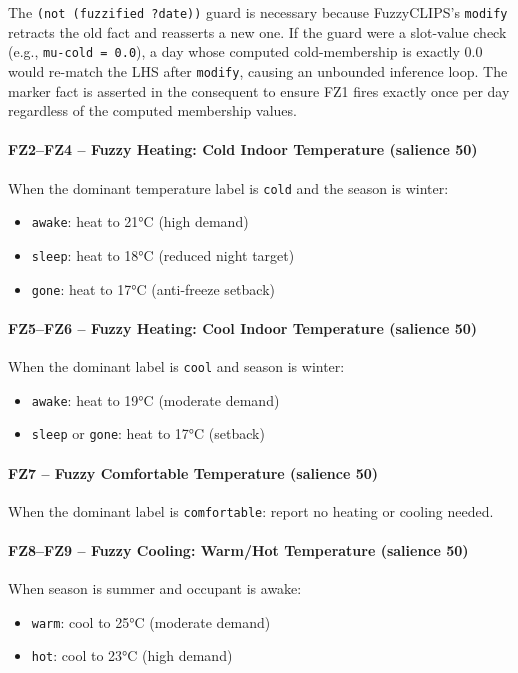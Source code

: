 \documentclass{article}
\begin{document}
The \texttt{(not (fuzzified ?date))} guard is necessary because FuzzyCLIPS's \texttt{modify} retracts the old fact and reasserts a new one.
If the guard were a slot-value check (e.g., \texttt{mu-cold = 0.0}), a day whose computed cold-membership is exactly 0.0 would re-match the LHS after \texttt{modify}, causing an unbounded inference loop.
The marker fact is asserted in the consequent to ensure FZ1 fires exactly once per day regardless of the computed membership values.

\paragraph{FZ2–FZ4 -- Fuzzy Heating: Cold Indoor Temperature (salience 50)}
When the dominant temperature label is \texttt{cold} and the season is winter:
\begin{itemize}
    \item \texttt{awake}: heat to 21°C (high demand)
    \item \texttt{sleep}: heat to 18°C (reduced night target)
    \item \texttt{gone}: heat to 17°C (anti-freeze setback)
\end{itemize}

\paragraph{FZ5–FZ6 -- Fuzzy Heating: Cool Indoor Temperature (salience 50)}
When the dominant label is \texttt{cool} and season is winter:
\begin{itemize}
    \item \texttt{awake}: heat to 19°C (moderate demand)
    \item \texttt{sleep} or \texttt{gone}: heat to 17°C (setback)
\end{itemize}

\paragraph{FZ7 -- Fuzzy Comfortable Temperature (salience 50)}
When the dominant label is \texttt{comfortable}: report no heating or cooling needed.

\paragraph{FZ8–FZ9 -- Fuzzy Cooling: Warm/Hot Temperature (salience 50)}
When season is summer and occupant is awake:
\begin{itemize}
    \item \texttt{warm}: cool to 25°C (moderate demand)
    \item \texttt{hot}: cool to 23°C (high demand)
\end{itemize}
\end{document}
